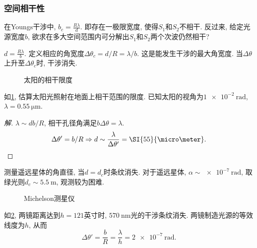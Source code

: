 \documentclass{ctexart}
\begin{document}

\subsubsection{空间相干性} %
\label{ssub:空间相干性}

在Youngs干涉中, $\displaystyle b_c=\frac{R\lambda}{d}$. 即存在一极限宽度, 使得$S_1$和$S_2$不相干. 反过来, 给定光源宽度$b$, 欲求在多大空间范围内可分解出$S_1$和$S_2$两个次波仍然相干?
\par
$\displaystyle d = \frac{R\lambda}{b}$. 定义相应的角宽度$\Delta \theta_c = d/R = \lambda/b$. 这是能发生干涉的最大角宽度. 当$\Delta\theta$上升至$\Delta\theta_c$时, 干涉消失.
\begin{figure}
    \centering
    \caption{太阳的相干限度}
    \label{fig:太阳的相干限度}
\end{figure}
\begin{sample}
    \begin{ex}
        如\cref{fig:太阳的相干限度}, 估算太阳光照射在地面上相干范围的限度. 已知太阳的视角为$\SI{1e-2}{\radian}$, $\lambda = \SI{0.55}{\micro\meter}$.
    \end{ex}
    \begin{proof}[解]
        $\lambda \sim db/R$, 相干孔径角满足$b\Delta\theta = \lambda$.
        \[ \Delta \theta' = b/R \Rightarrow d\sim \frac{\lambda}{\Delta\theta'} = \SI{55}{\micro\meter}. \qedhere \]
    \end{proof}
\end{sample}
\begin{sample}
    \begin{ex}
        测量遥远星体的角直径, 当$d=d_c$时条纹消失. 对于遥远星体, $\alpha\sim\SI{e-7}{\radian}$, 取绿光则$d_c\sim \SI{5.5}{\meter}$, 观测较为困难.
    \end{ex}
\end{sample}
\begin{figure}[ht]
    \centering
    \caption{Michelson测星仪}
    \label{fig:michelson测星仪}
\end{figure}
\begin{sample}
    \begin{ex}[Michelson干涉仪]
        如\cref{fig:michelson测星仪}, 两镜距离达到$h=121$英寸时, $\SI{570}{\nano\meter}$光的干涉条纹消失. 两镜制造光源的等效线度为$h$, 从而
        \[ \Delta \theta' = \frac{b}{R} = \frac{\lambda}{h} = \SI{2e-7}{\radian}. \]
    \end{ex}
\end{sample}
\end{document}
